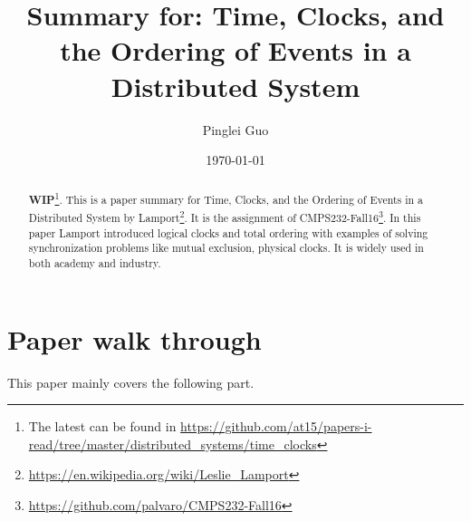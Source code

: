 \documentclass[12pt,a4paper,oneside]{article}
\title{Summary for: Time, Clocks, and the Ordering of Events in a Distributed System}
\author{Pinglei Guo}
\date{\today}
\begin{document}
\maketitle

\begin{abstract}

\textbf{WIP}\footnote{The latest can be found in \url{https://github.com/at15/papers-i-read/tree/master/distributed_systems/time_clocks}}.
This is a paper summary for Time, Clocks, and the Ordering of Events in a Distributed System\cite{l} by Lamport\footnote{\url{https://en.wikipedia.org/wiki/Leslie_Lamport}}.
It is the assignment of CMPS232-Fall16\footnote{\url{https://github.com/palvaro/CMPS232-Fall16}}.
In this paper Lamport introduced logical clocks and total ordering with examples of solving synchronization problems like mutual exclusion, physical clocks.
It is widely used in both academy and industry.

\end{abstract}

\section{Paper walk through}

This paper mainly covers the following part.
\end{document}
